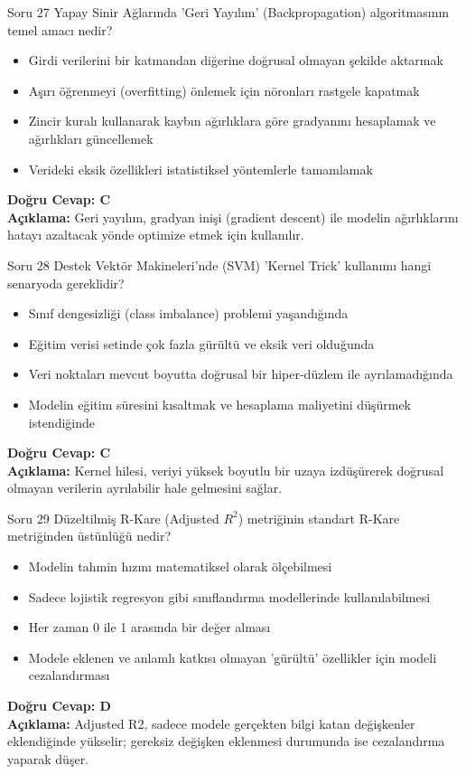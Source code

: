 \documentclass[12pt,a4paper]{article}
\begin{document}
\begin{testcard}{Soru 27}
    Yapay Sinir Ağlarında 'Geri Yayılım' (Backpropagation) algoritmasının temel amacı nedir?
    \begin{itemize}
        \item[A)] Girdi verilerini bir katmandan diğerine doğrusal olmayan şekilde aktarmak
        \item[B)] Aşırı öğrenmeyi (overfitting) önlemek için nöronları rastgele kapatmak
        \item[C)] Zincir kuralı kullanarak kaybın ağırlıklara göre gradyanını hesaplamak ve ağırlıkları güncellemek
        \item[D)] Verideki eksik özellikleri istatistiksel yöntemlerle tamamlamak
    \end{itemize}
    \tcblower
    \textbf{Doğru Cevap: C} \\
    \textbf{Açıklama:} Geri yayılım, gradyan inişi (gradient descent) ile modelin ağırlıklarını hatayı azaltacak yönde optimize etmek için kullanılır.
\end{testcard}

\begin{testcard}{Soru 28}
    Destek Vektör Makineleri'nde (SVM) 'Kernel Trick' kullanımı hangi senaryoda gereklidir?
    \begin{itemize}
        \item[A)] Sınıf dengesizliği (class imbalance) problemi yaşandığında
        \item[B)] Eğitim verisi setinde çok fazla gürültü ve eksik veri olduğunda
        \item[C)] Veri noktaları mevcut boyutta doğrusal bir hiper-düzlem ile ayrılamadığında
        \item[D)] Modelin eğitim süresini kısaltmak ve hesaplama maliyetini düşürmek istendiğinde
    \end{itemize}
    \tcblower
    \textbf{Doğru Cevap: C} \\
    \textbf{Açıklama:} Kernel hilesi, veriyi yüksek boyutlu bir uzaya izdüşürerek doğrusal olmayan verilerin ayrılabilir hale gelmesini sağlar.
\end{testcard}

\begin{testcard}{Soru 29}
    Düzeltilmiş R-Kare (Adjusted $R^2$) metriğinin standart R-Kare metriğinden üstünlüğü nedir?
    \begin{itemize}
        \item[A)] Modelin tahmin hızını matematiksel olarak ölçebilmesi
        \item[B)] Sadece lojistik regresyon gibi sınıflandırma modellerinde kullanılabilmesi
        \item[C)] Her zaman 0 ile 1 arasında bir değer alması
        \item[D)] Modele eklenen ve anlamlı katkısı olmayan 'gürültü' özellikler için modeli cezalandırması
    \end{itemize}
    \tcblower
    \textbf{Doğru Cevap: D} \\
    \textbf{Açıklama:} Adjusted R2, sadece modele gerçekten bilgi katan değişkenler eklendiğinde yükselir; gereksiz değişken eklenmesi durumunda ise cezalandırma yaparak düşer.
\end{testcard}
\end{document}
